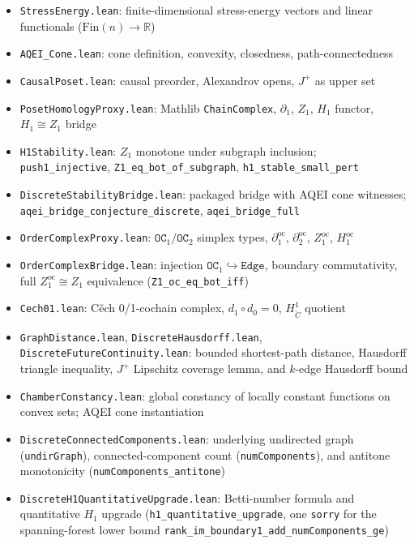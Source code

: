 \documentclass[12pt]{article}
\begin{document}
\begin{itemize}
    \item \texttt{StressEnergy.lean}: finite-dimensional stress-energy vectors
          and linear functionals ($\mathrm{Fin}(n) \to \mathbb{R}$)
    \item \texttt{AQEI\_Cone.lean}: cone definition, convexity,
          closedness, path-connectedness
    \item \texttt{CausalPoset.lean}: causal preorder, Alexandrov opens,
          $J^+$ as upper set
    \item \texttt{PosetHomologyProxy.lean}: Mathlib \texttt{ChainComplex},
          $\partial_1$, $Z_1$, $H_1$ functor, $H_1\cong Z_1$ bridge
    \item \texttt{H1Stability.lean}: $Z_1$ monotone under subgraph inclusion;
          \texttt{push1\_injective}, \texttt{Z1\_eq\_bot\_of\_subgraph},
          \texttt{h1\_stable\_small\_pert}
    \item \texttt{DiscreteStabilityBridge.lean}: packaged bridge with AQEI cone
          witnesses; \texttt{aqei\_bridge\_conjecture\_discrete},
          \texttt{aqei\_bridge\_full}
    \item \texttt{OrderComplexProxy.lean}: $\texttt{OC}_1/\texttt{OC}_2$
          simplex types, $\partial_1^{\mathrm{oc}}$, $\partial_2^{\mathrm{oc}}$,
          $Z_1^{\mathrm{oc}}$, $H_1^{\mathrm{oc}}$
    \item \texttt{OrderComplexBridge.lean}: injection $\texttt{OC}_1 \hookrightarrow
          \texttt{Edge}$, boundary commutativity, full $Z_1^{\mathrm{oc}}\cong Z_1$
          equivalence (\texttt{Z1\_oc\_eq\_bot\_iff})
    \item \texttt{Cech01.lean}: C\v{e}ch 0/1-cochain complex, $d_1\circ d_0=0$,
          $H^1_{\check{C}}$ quotient
    \item \texttt{GraphDistance.lean}, \texttt{DiscreteHausdorff.lean},
          \texttt{DiscreteFutureContinuity.lean}: bounded shortest-path
          distance, Hausdorff triangle inequality, $J^+$ Lipschitz coverage
          lemma, and $k$-edge Hausdorff bound
    \item \texttt{ChamberConstancy.lean}: global constancy of locally
          constant functions on convex sets; AQEI cone instantiation
    \item \texttt{DiscreteConnectedComponents.lean}: underlying undirected
          graph (\texttt{undirGraph}), connected-component count
          (\texttt{numComponents}), and antitone monotonicity
          (\texttt{numComponents\_antitone})
    \item \texttt{DiscreteH1QuantitativeUpgrade.lean}: Betti-number formula
          and quantitative $H_1$ upgrade (\texttt{h1\_quantitative\_upgrade},
          one \texttt{sorry} for the spanning-forest lower bound
          \texttt{rank\_im\_boundary1\_add\_numComponents\_ge})
\end{itemize}
\end{document}
